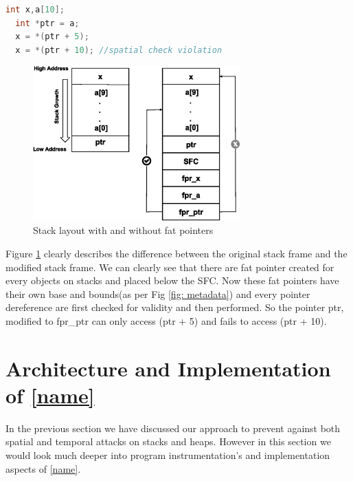 \begin{lstlisting}[language=C]
  int x,a[10];
  int *ptr = a;
  x = *(ptr + 5);
  x = *(ptr + 10); //spatial check violation
\end{lstlisting}

\begin{figure}
\centering
\captionsetup{justification=centering}
\includegraphics[width=8cm]{stackframe.eps}
\caption{Stack layout with and without fat pointers}
\label{fig:stackframe}
\hrulefill
\end{figure}

Figure \ref{fig:stackframe} clearly describes the difference between the original stack frame and the modified stack frame. We can clearly see that there are fat pointer created for every objects on stacks and placed below the SFC. Now these fat pointers have their own base and bounds(as per Fig \ref{fig: metadata}) and every pointer dereference are first checked for validity and then performed. So the pointer ptr, modified to fpr\_ptr can only access (ptr + 5) and fails to access (ptr + 10).

\section{Architecture and Implementation of \ref{name}}
In the previous section we have discussed our approach to prevent against both spatial and temporal attacks on stacks and heaps. However in this section we would look much deeper into program instrumentation's and implementation aspects of \ref{name}. 

